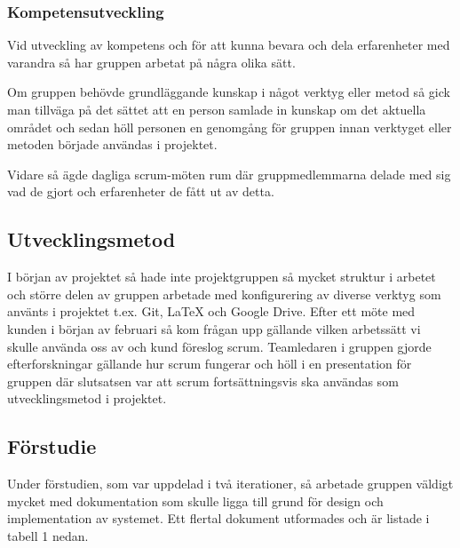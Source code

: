 \documentclass[a4paper,10pt]{article}
\begin{document}
\subsubsection{Kompetensutveckling}
Vid utveckling av kompetens och för att kunna bevara och dela erfarenheter med varandra så har gruppen arbetat på några olika sätt.

Om gruppen behövde grundläggande kunskap i något verktyg eller metod så gick man tillväga på det sättet att en person samlade in kunskap om det aktuella området och sedan höll personen en genomgång för gruppen innan verktyget eller metoden började användas i projektet.

Vidare så ägde dagliga scrum-möten rum där gruppmedlemmarna delade med sig vad de gjort och erfarenheter de fått ut av detta.

\subsection{Utvecklingsmetod}
I början av projektet så hade inte projektgruppen så mycket struktur i arbetet och större delen av gruppen arbetade med konfigurering av diverse verktyg som använts i projektet t.ex. Git, LaTeX och Google Drive.
Efter ett möte med kunden i början av februari så kom frågan upp gällande vilken arbetssätt vi skulle använda oss av och kund föreslog scrum. Teamledaren i gruppen gjorde efterforskningar gällande hur scrum fungerar och höll i en presentation för gruppen där slutsatsen var att scrum fortsättningsvis ska användas som utvecklingsmetod i projektet.

\subsection{Förstudie}
Under förstudien, som var uppdelad i två iterationer, så arbetade gruppen väldigt mycket med dokumentation som skulle ligga till grund för design och implementation av systemet. Ett flertal dokument utformades och är listade i tabell 1 nedan.
\end{document}
